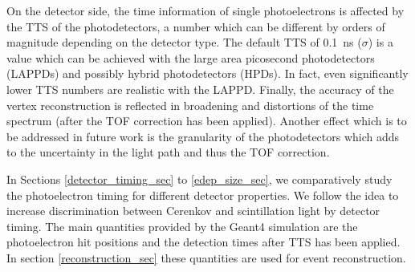 \documentclass[aps,prc,twocolumn,groupedaddress,showpacs,amsmath,amssymb,floatfix,superscriptaddress]{revtex4}
\begin{document}
On the detector side, the time information of single photoelectrons is affected by the TTS of the photodetectors, a number which can be different by orders of magnitude depending on the detector type. The default TTS of 0.1~ns ($\sigma$) is a value which can be achieved with the large area picosecond photodetectors (LAPPDs)\cite{LAPPDSum,LAPPDTDR} and possibly hybrid photodetectors (HPDs)\cite{hpdThesis}. In fact, even significantly lower TTS numbers are realistic with the LAPPD. Finally, the accuracy of the vertex reconstruction is reflected in broadening and distortions of the time spectrum (after the TOF correction has been applied). Another effect which is to be addressed in future work is the granularity of the photodetectors which adds to the uncertainty in the light path and thus the TOF correction.   

In Sections \ref{detector_timing_sec} to \ref{edep_size_sec}, we comparatively study the photoelectron timing for different detector properties. We follow the idea to increase discrimination between Cerenkov and scintillation light by detector timing. The main quantities provided by the Geant4 simulation are the photoelectron hit positions and the detection times after TTS has been applied. In section \ref{reconstruction_sec} these quantities are used for event reconstruction.
\end{document}
